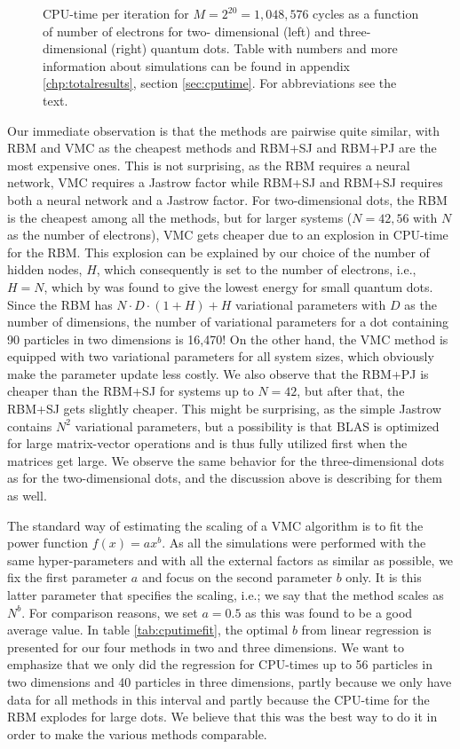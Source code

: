 \begin{figure}
	\centering 
	
	\caption{CPU-time per iteration for $M=2^{20}=1,048,576$ cycles as a function of number of electrons for two- dimensional (left) and three-dimensional (right) quantum dots. Table with numbers and more information about simulations can be found in appendix \ref{chp:totalresults}, section \ref{sec:cputime}. For abbreviations see the text.}
	\label{fig:cpu_time}
\end{figure} 

Our immediate observation is that the methods are pairwise quite similar, with RBM and VMC as the cheapest methods and RBM+SJ and RBM+PJ are the most expensive ones. This is not surprising, as the RBM requires a neural network, VMC requires a Jastrow factor while RBM+SJ and RBM+SJ requires both a neural network and a Jastrow factor. For two-dimensional dots, the RBM is the cheapest among all the methods, but for larger systems ($N=42,56$ with $N$ as the number of electrons), VMC gets cheaper due to an explosion in CPU-time for the RBM. This explosion can be explained by our choice of the number of hidden nodes, $H$, which consequently is set to the number of electrons, i.e., $H=N$, which by \citet{nordhagen_computational_2018} was found to give the lowest energy for small quantum dots. Since the RBM has $N\cdot D\cdot (1+H)+H$ variational parameters with $D$ as the number of dimensions, the number of variational parameters for a dot containing 90 particles in two dimensions is 16,470! On the other hand, the VMC method is equipped with two variational parameters for all system sizes, which obviously make the parameter update less costly. We also observe that the RBM+PJ is cheaper than the RBM+SJ for systems up to $N=42$, but after that, the RBM+SJ gets slightly cheaper. This might be surprising, as the simple Jastrow contains $N^2$ variational parameters, but a possibility is that BLAS is optimized for large matrix-vector operations and is thus fully utilized first when the matrices get large. We observe the same behavior for the three-dimensional dots as for the two-dimensional dots, and the discussion above is describing for them as well.

The standard way of estimating the scaling of a VMC algorithm is to fit the power function $f(x)=ax^b$. As all the simulations were performed with the same hyper-parameters and with all the external factors as similar as possible, we fix the first parameter $a$ and focus on the second parameter $b$ only. It is this latter parameter that specifies the scaling, i.e.; we say that the method scales as $N^b$. For comparison reasons, we set $a=0.5$ as this was found to be a good average value. In table \eqref{tab:cputimefit}, the optimal $b$ from linear regression is presented for our four methods in two and three dimensions. We want to emphasize that we only did the regression for CPU-times up to 56 particles in two dimensions and 40 particles in three dimensions, partly because we only have data for all methods in this interval and partly because the CPU-time for the RBM explodes for large dots. We believe that this was the best way to do it in order to make the various methods comparable. 

